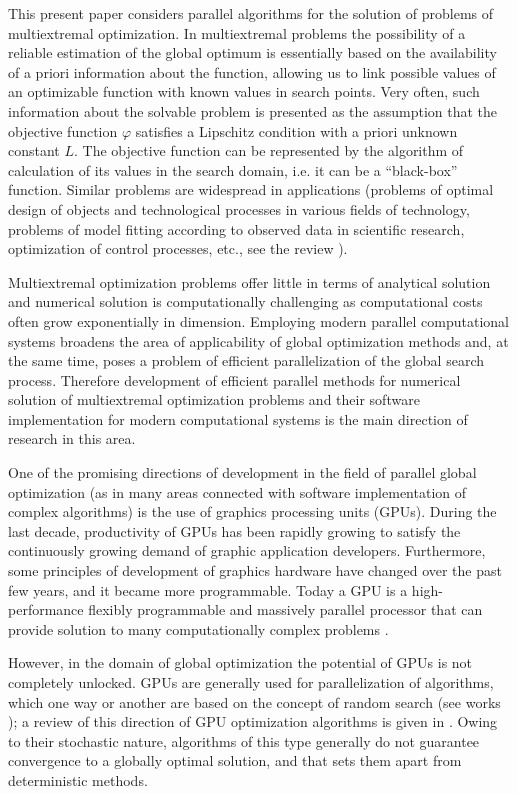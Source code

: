 \documentclass[smallcondensed]{svjour3}     %
\begin{document}
This present paper considers parallel algorithms for the solution of problems of multiextremal optimization. In multiextremal problems the possibility of a reliable estimation of the global optimum is essentially based on the availability of a priori information about the function, allowing us to link possible values of an optimizable function with known values in search points. Very often, such information about the solvable problem is presented as the assumption that the objective function $\varphi$ satisfies a Lipschitz condition with a priori unknown constant $L$. The objective function can be represented by the algorithm of calculation of its values in the search domain, i.e. it can be a ``black-box'' function. Similar problems are widespread in applications (problems of optimal design of objects and technological processes in various fields of technology, problems of model fitting according to observed data in scientific research, optimization of control processes, etc., see the review \cite{RefPinter}).

Multiextremal optimization problems offer little in terms of analytical solution and numerical solution is computationally challenging as computational costs often grow exponentially in dimension. Employing modern parallel computational systems broadens the area of applicability of global optimization methods and, at the same time, poses a problem of efficient parallelization of the global search process. Therefore development of efficient parallel methods for numerical solution of multiextremal optimization problems and their software implementation for modern computational systems is the main direction of research in this area.

One of the promising directions of development in the field of parallel global optimization (as in many areas connected with software implementation of complex algorithms) is the use of graphics processing units (GPUs). During the last decade, productivity of GPUs has been rapidly growing to satisfy the continuously growing demand of graphic application developers. Furthermore, some principles of development of graphics hardware have changed over the past few years, and it became more programmable. Today a GPU is a high-performance flexibly programmable and massively parallel processor that can provide solution to many computationally complex problems \cite{RefHwu}.

However, in the domain of global optimization the potential of GPUs is not completely unlocked. GPUs are generally used for parallelization of algorithms, which one way or another are based on the concept of random search (see works \cite{RefFerreiro,RefZhu,RefGarcia,RefMussi}); a review of this direction of GPU optimization algorithms is given in \cite{RefLangdon}. Owing to their stochastic nature, algorithms of this type generally do not guarantee convergence to a globally optimal solution, and that sets them apart from deterministic methods.
\end{document}
